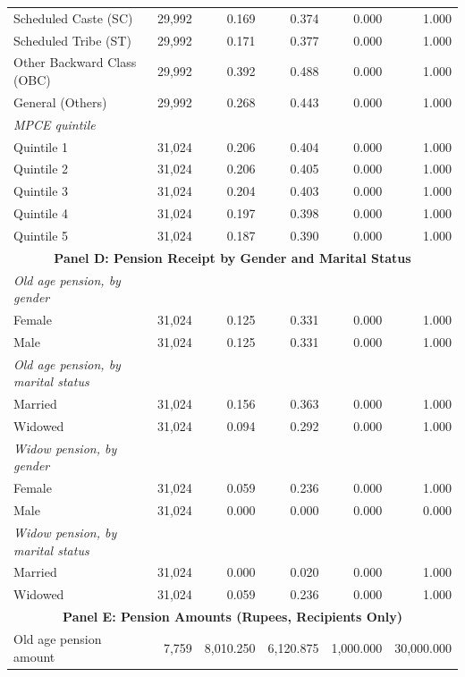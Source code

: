 \begin{table}[H]
{\begin{tabular}{lrrrrr}
\quad \quad Scheduled Caste (SC) & 29,992 & 0.169 & 0.374 & 0.000 & 1.000 \\
\quad \quad Scheduled Tribe (ST) & 29,992 & 0.171 & 0.377 & 0.000 & 1.000 \\
\quad \quad Other Backward Class (OBC) & 29,992 & 0.392 & 0.488 & 0.000 & 1.000 \\
\quad \quad General (Others) & 29,992 & 0.268 & 0.443 & 0.000 & 1.000 \\
\textit{\quad MPCE quintile} & & & & & \\
\quad \quad Quintile 1 & 31,024 & 0.206 & 0.404 & 0.000 & 1.000 \\
\quad \quad Quintile 2 & 31,024 & 0.206 & 0.405 & 0.000 & 1.000 \\
\quad \quad Quintile 3 & 31,024 & 0.204 & 0.403 & 0.000 & 1.000 \\
\quad \quad Quintile 4 & 31,024 & 0.197 & 0.398 & 0.000 & 1.000 \\
\quad \quad Quintile 5 & 31,024 & 0.187 & 0.390 & 0.000 & 1.000 \\
\midrule
\multicolumn{6}{c}{\textbf{Panel D: Pension Receipt by Gender and Marital Status}} \\
\midrule
\textit{\quad Old age pension, by gender} & & & & & \\
\quad \quad Female & 31,024 & 0.125 & 0.331 & 0.000 & 1.000 \\
\quad \quad Male & 31,024 & 0.125 & 0.331 & 0.000 & 1.000 \\
\textit{\quad Old age pension, by marital status} & & & & & \\
\quad \quad Married & 31,024 & 0.156 & 0.363 & 0.000 & 1.000 \\
\quad \quad Widowed & 31,024 & 0.094 & 0.292 & 0.000 & 1.000 \\
\textit{\quad Widow pension, by gender} & & & & & \\
\quad \quad Female & 31,024 & 0.059 & 0.236 & 0.000 & 1.000 \\
\quad \quad Male & 31,024 & 0.000 & 0.000 & 0.000 & 0.000 \\
\textit{\quad Widow pension, by marital status} & & & & & \\
\quad \quad Married & 31,024 & 0.000 & 0.020 & 0.000 & 1.000 \\
\quad \quad Widowed & 31,024 & 0.059 & 0.236 & 0.000 & 1.000 \\
\midrule
\multicolumn{6}{c}{\textbf{Panel E: Pension Amounts (Rupees, Recipients Only)}} \\
\midrule
Old age pension amount & 7,759 & 8,010.250 & 6,120.875 & 1,000.000 & 30,000.000 \\

\end{tabular}}
\end{table}
